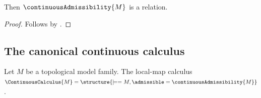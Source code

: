 \begin{proposition}\label{continuous_admissibility_is_relation}
    Then $\continuousAdmissibility{M}$ is a relation.
\end{proposition}
\begin{proof}
    Follows by .
\end{proof}

\subsection{The canonical continuous calculus}

\begin{construction}\label{continuous_calculus}
    Let $M$ be a topological model family.
    The local-map calculus $\ContinuousCalculus{M}=
        \structure{\models=M,\admissible=\continuousAdmissibility{M}}$.
\end{construction}
